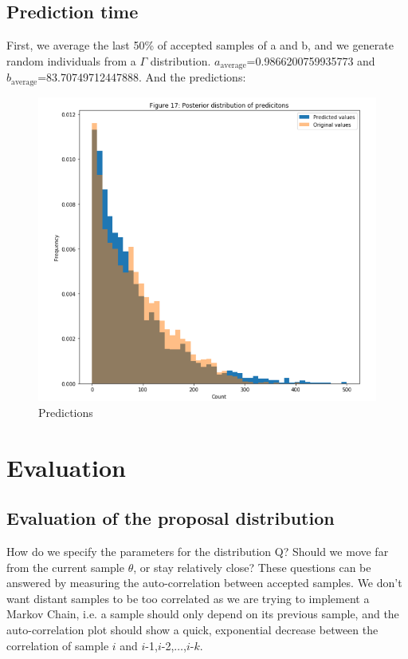 \subsection{Prediction time}
First, we average the last 50\% of accepted samples of a and b, and we generate random individuals from a  $\Gamma$ distribution. $a_\textrm{average}$=0.9866200759935773 and $b_\textrm{average}$=83.70749712447888.
And the predictions:

\begin{figure}[h]
    \centering
\includegraphics[width=.8\textwidth]{pic/p05c08-snip15}
    \caption{Predictions}
    \label{fig:p05c08-snip15}
\end{figure}

\FloatBarrier
\section{Evaluation}
\subsection{Evaluation of the proposal distribution}
How do we specify the parameters for the distribution Q? Should we move far from the current sample $\theta$, or stay relatively close? These questions can be answered by measuring the auto-correlation between accepted samples. We don't want distant samples to be too correlated as we are trying to implement a Markov Chain, i.e. a sample should only depend on its previous sample, and the auto-correlation plot should show a quick, exponential decrease between the correlation of sample $i$ and $i$-1,$i$-2,$\ldots$,$i$-$k$.

